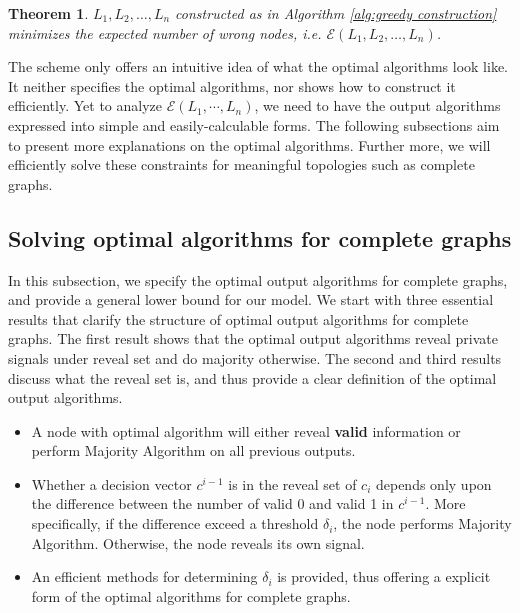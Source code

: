 \documentclass[a4paper,UKenglish]{lipics}
\newtheorem{thm}{Theorem}[section] %
\theoremstyle{definition}
\begin{document}
\begin{thm}
\label{local implies overall}
$L_1, L_2, \dots, L_n$ constructed as in Algorithm \ref{alg:greedy construction} minimizes the expected number of wrong nodes, 
	i.e. $\mathcal{E}(L_1, L_2, \dots, L_n)$.
\end{thm}

The scheme only offers an intuitive idea of what the optimal algorithms look like.
It neither specifies the optimal algorithms, nor shows how to construct it efficiently.  
Yet to analyze $\mathcal{E}(L_1, \dotsb, L_n)$, we need to have the output algorithms expressed into simple and easily-calculable forms. 
The following subsections aim to present more explanations on the optimal algorithms. 
Further more, we will efficiently solve these constraints for meaningful topologies such as complete graphs.


\subsection {Solving optimal algorithms for complete graphs}
In this subsection, we specify the optimal output algorithms for complete graphs,
	and provide a general lower bound for our model.
We start with three essential results that clarify the structure of optimal output algorithms for complete graphs.
The first result shows that the optimal output algorithms reveal private signals under reveal set and do majority otherwise.
The second and third results discuss what the reveal set is, and thus provide a clear definition of the optimal output algorithms.
\begin{itemize}
\item A node with optimal algorithm will either reveal \textbf{valid} information or perform Majority Algorithm on all previous outputs.
\item Whether a decision vector $c^{i-1}$ is in the reveal set of $c_i$ depends only upon
		the difference between the number of valid 0 and valid 1 in $c^{i-1}$.
	More specifically, if the difference exceed a threshold $\delta_i$, the node performs Majority Algorithm.
	Otherwise, the node reveals its own signal.
\item An efficient methods for determining $\delta_i$ is provided, thus offering a explicit form of the optimal algorithms for complete graphs.
\end{itemize}
\end{document}
